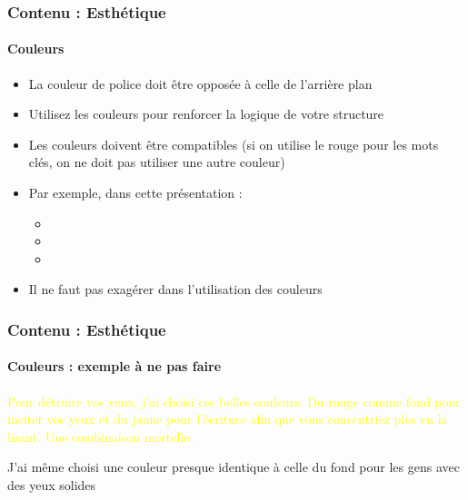 \documentclass[xcolor=table, usenames,dvipsnames]{beamer}
\begin{document}
\begin{frame}
\frametitle{Contenu : Esthétique}
\framesubtitle{Couleurs}

\begin{itemize}
	\item La couleur de police doit être opposée à celle de l'arrière plan
	\item Utilisez les couleurs pour renforcer la logique de votre structure
	\item Les couleurs doivent être compatibles (si on utilise le rouge pour les mots clés, on ne doit pas utiliser une autre couleur)
	\item Par exemple, dans cette présentation : 
	\begin{itemize}
		\item {}
		\item {}
		\item {} 
	\end{itemize}
	\item Il ne faut pas exagérer dans l'utilisation des couleurs 
\end{itemize}

\end{frame}

{
\begin{frame}
\frametitle{Contenu : Esthétique}
\framesubtitle{Couleurs : exemple à ne pas faire}

\textcolor{yellow}{Pour détruire vos yeux, j'ai choisi ces belles couleurs. Du rouge comme fond pour inciter vos yeux et du jaune pour l'écriture afin que vous concentriez plus en la lisant. Une combinaison mortelle.}

\vfill

\textcolor{WildStrawberry}{J'ai même choisi une couleur presque identique à celle du fond pour les gens avec des yeux solides}

\end{frame}
}
\end{document}
